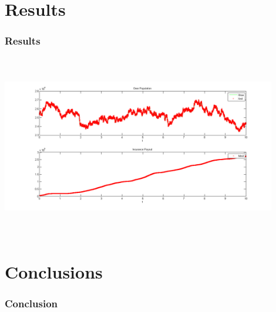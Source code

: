 



\section{Results}

\begin{frame}
    \frametitle{Results}
\vspace{-4mm}
\includegraphics[height=8cm,width=12cm]{deerins}
\end{frame}






\section{Conclusions}

\begin{frame}
    \frametitle{Conclusion}
\end{frame}




